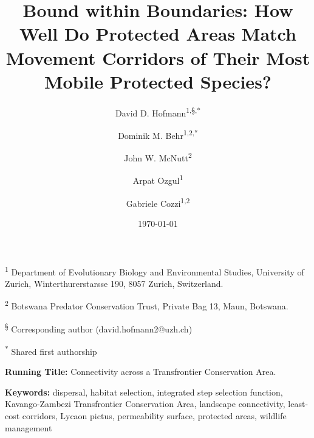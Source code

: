 \documentclass[abstract=on,10pt,a4paper,bibliography=totocnumbered]{article}
\title{Bound within Boundaries: How Well Do Protected Areas Match Movement
Corridors of Their Most Mobile Protected Species?}
\author{
  David D. Hofmann\textsuperscript{1,\S,*} \and
  Dominik M. Behr\textsuperscript{1,2,*} \and
  John W. McNutt\textsuperscript{2} \and
  Arpat Ozgul\textsuperscript{1} \and
  Gabriele Cozzi\textsuperscript{1,2}
}
\date{\today}
\begin{document}



\maketitle

\begin{flushleft}

\vspace{0.5cm}

\textsuperscript{1} Department of Evolutionary Biology and Environmental
Studies, University of Zurich, Winterthurerstarsse 190, 8057 Zurich,
Switzerland.

\textsuperscript{2} Botswana Predator Conservation Trust, Private Bag 13, Maun,
Botswana.

\textsuperscript{\S} Corresponding author (david.hofmann2@uzh.ch)

\textsuperscript{*} Shared first authorship

\vspace{4cm}

\textbf{Running Title:} Connectivity across a Transfrontier Conservation Area.

\vspace{0.5cm}

\textbf{Keywords:} dispersal, habitat selection, integrated step selection
function, Kavango-Zambezi Transfrontier Conservation Area, landscape
connectivity, least-cost corridors, Lycaon pictus, permeability surface,
protected areas, wildlife management

\end{flushleft}
\end{document}
